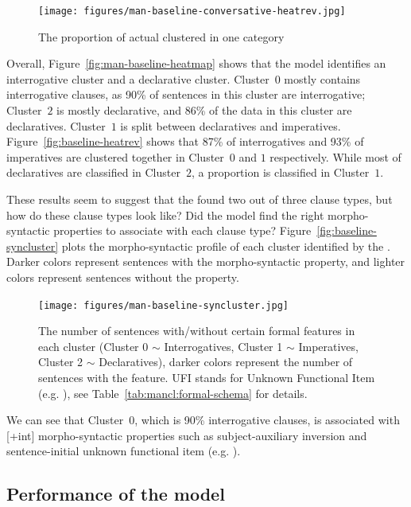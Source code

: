 \begin{figure}[H]
    \centering
    \texttt{[image: figures/man-baseline-conversative-heatrev.jpg]}
    \caption{The proportion of actual \diis{} clustered in one category}
    \label{fig:man-baseline-mid-heatrev}
\end{figure}

Overall, Figure~\ref{fig:man-baseline-heatmap} shows that the \dlearnerabbr{} model identifies an interrogative cluster and a declarative cluster. Cluster~$0$ mostly contains interrogative clauses, as 90\% of sentences in this cluster are interrogative; Cluster~$2$ is mostly declarative, and 86\% of the data in this cluster are declaratives. Cluster~$1$ is split between declaratives and imperatives. Figure~\ref{fig:baseline-heatrev} shows that 87\% of interrogatives and 93\% of imperatives are clustered together in Cluster~$0$ and $1$ respectively. While most of declaratives are classified in Cluster~$2$, a proportion is classified in Cluster~$1$.

These results seem to suggest that the \dlearnerabbr{} found two out of three clause types, but how do these clause types look like? Did the model find the right morpho-syntactic properties to associate with each clause type? Figure~\ref{fig:baseline-syncluster} plots the morpho-syntactic profile of each cluster identified by the \dlearnerabbr{}. Darker colors represent sentences with the morpho-syntactic property, and lighter colors represent sentences without the property. 

\begin{figure}[H]
    \centering
    \texttt{[image: figures/man-baseline-syncluster.jpg]}
    \caption{The number of sentences with/without certain formal features in each cluster (Cluster 0 $\sim$ Interrogatives, Cluster 1 $\sim$ Imperatives, Cluster 2 $\sim$ Declaratives), darker colors represent the number of sentences with the feature. UFI stands for Unknown Functional Item (e.g. \twh{}), see Table~\ref{tab:mancl:formal-schema} for details.}
    \label{fig:man-baseline-syncluster}
\end{figure}

We can see that Cluster~$0$, which is 90\% interrogative clauses, is associated with [+int] morpho-syntactic properties such as subject-auxiliary inversion and sentence-initial unknown functional item (e.g. \twh{}).

\subsection{Performance of the \plearnerabbr{} model}
\label{sec:mancl:model:results:d}

